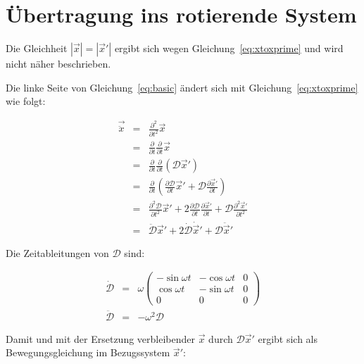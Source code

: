 \documentclass[12pt]{article}
\begin{document}
\section{Übertragung ins rotierende System}

Die Gleichheit $\left| \vec{x} \right| = \left| \vec{x}' \right|$ ergibt sich wegen Gleichung~\ref{eq:xtoxprime} und wird nicht näher beschrieben.

Die linke Seite von Gleichung~\ref{eq:basic} ändert sich mit Gleichung~\ref{eq:xtoxprime} wie folgt:

\begin{eqnarray}
\vec{\ddot{x}}
  &=& \frac{\partial^2}{\partial t^2} \vec{x} \nonumber \\
  &=& \frac{\partial}{\partial t} \frac{\partial}{\partial t} \vec{x} \nonumber \\
  &=& \frac{\partial}{\partial t} \frac{\partial}{\partial t} \left( \mathcal{D} \vec{x}' \right) \nonumber \\
  &=& \frac{\partial}{\partial t} \left( \frac{\partial\mathcal{D}}{\partial t} \vec{x}' + \mathcal{D} \frac{\partial\vec{x}'}{\partial t} \right) \nonumber \\
  &=& \frac{\partial^2\mathcal{D}}{\partial t^2} \vec{x}'
     + 2 \frac{\partial\mathcal{D}}{\partial t} \frac{\partial\vec{x}'}{\partial t}
     + \mathcal{D} \frac{\partial^2\vec{x}'}{\partial t^2} \nonumber \\
  &=& \ddot{\mathcal{D}}\vec{x}' + 2 \dot{\mathcal{D}}\dot{\vec{x}}' + \mathcal{D}\ddot{\vec{x}}' \nonumber 
\end{eqnarray}

Die Zeitableitungen von $\mathcal{D}$ sind:

\begin{eqnarray}
\dot{\mathcal{D}} &=& \omega \left(
\begin{matrix}
 -\sin \omega t & -\cos \omega t & 0 \\
  \cos \omega t & -\sin \omega t & 0 \\
  0             &  0             & 0
\end{matrix}
\right) \nonumber \\
\ddot{\mathcal{D}} &=& -\omega^2 \mathcal{D} \nonumber 
\end{eqnarray}

Damit und mit der Ersetzung verbleibender $\vec{x}$ durch $\mathcal{D}\vec{x}'$ ergibt sich als Bewegungsgleichung im Bezugssystem $\vec{x}'$:
\end{document}
